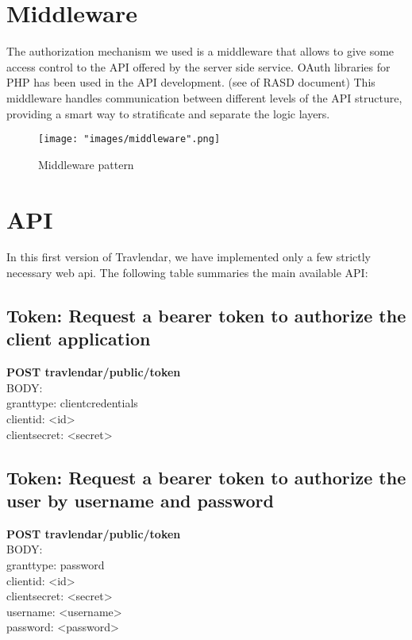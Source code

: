 \section{Middleware}
The authorization mechanism we used is a middleware that allows to give some access control to the API offered by the server side service. OAuth libraries for PHP has been used in the API development. (see  of RASD document) This middleware handles communication between different levels of the API structure, providing a smart way to stratificate and separate the logic layers.

\begin{figure}[H]
\begin{center}
\texttt{[image: "images/middleware".png]}
\caption{Middleware pattern}
\end{center}
\end{figure}


\section{API}
In this first version of Travlendar, we have implemented only a few strictly necessary web api. The following table summaries the main available API:

\subsection{Token: Request a bearer token to authorize the client application}
\textbf{POST travlendar/public/token}\\
BODY:\\
grant\textunderscore type: client\textunderscore credentials\\
client\textunderscore id: <id>\\
client\textunderscore secret: <secret>\\

\subsection{Token: Request a bearer token to authorize the user by username and password}
\textbf{POST travlendar/public/token}\\
BODY:\\
grant\textunderscore type: password\\
client\textunderscore id: <id>\\
client\textunderscore secret: <secret>\\
username: <username>\\
password: <password>\\

